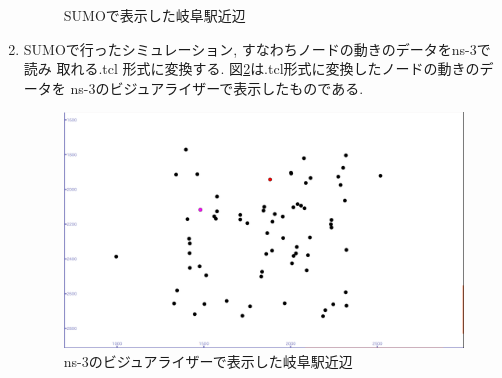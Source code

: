 \begin{enumerate}
\begin{figure}[h]
    \caption{SUMOで表示した岐阜駅近辺}
    \label{fig:sumo2}
  \end{figure}
  \item SUMOで行ったシミュレーション, すなわちノードの動きのデータをns-3で読み
  取れる.tcl 形式に変換する. 図\ref{fig:sumo3}は.tcl形式に変換したノードの動きのデータを
  ns-3のビジュアライザーで表示したものである.
  \begin{figure}[h]
    \centering
    \includegraphics[scale=0.3]{figures/SUMO3.png}
    \caption{ns-3のビジュアライザーで表示した岐阜駅近辺}
    \label{fig:sumo3}
  \end{figure}

\end{enumerate}
